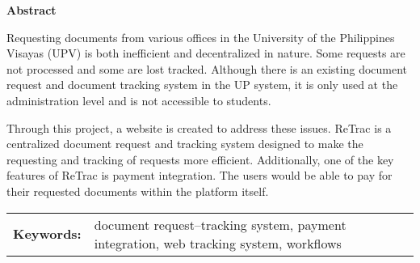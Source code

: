 \begin{center}
\textbf{Abstract}
\end{center}
\setlength{\parindent}{0pt}
Requesting documents from various offices in the University of the Philippines Visayas (UPV) is both inefficient and decentralized in nature. Some requests are not processed and some are lost tracked. Although there is an existing document request and document tracking system in the UP system, it is only used at the administration level and is not accessible to students. 

Through this project, a website is created to address these issues. ReTrac is a centralized document request and tracking system designed to make the requesting and tracking of requests more efficient. Additionally, one of the key features of ReTrac is payment integration. The users would be able to pay for their requested documents within the platform itself. 



\begin{tabular}{lp{4.25in}}
\hspace{-0.5em}\textbf{Keywords:}\hspace{0.25em} & document request--tracking system, payment integration, web tracking system, workflows \\
\end{tabular}
